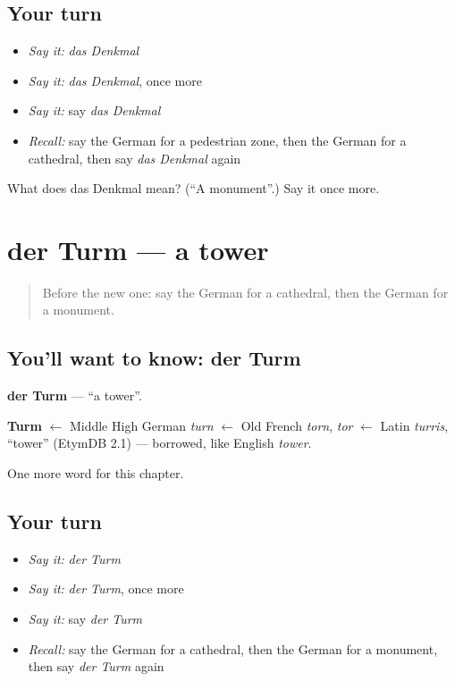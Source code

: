 \subsection*{Your turn}
\begin{itemize}
\raggedright
  \item \emph{Say it:} \emph{das Denkmal}
  \item \emph{Say it:} \emph{das Denkmal}, once more
  \item \emph{Say it:} say \emph{das Denkmal}
  \item \emph{Recall:} say the German for a pedestrian zone, then the German for a cathedral, then say \emph{das Denkmal} again
\end{itemize}

\begin{tcolorbox}[breakable,colback=teal!4,colframe=teal!35!black,title={Before you move on}]
What does das Denkmal mean? (\textquotedblleft{}A monument\textquotedblright{}.) Say it once more.
\end{tcolorbox}
\section[der Turm]{der Turm — a tower}

\label{lesson:GE-C195-turm}



\begin{quote}
Before the new one: say the German for a cathedral, then the German for a monument.
\end{quote}

\subsection*{You'll want to know: der Turm}
\textbf{der Turm} — \textquotedblleft{}a tower\textquotedblright{}.

\begin{cousinweb}
\textbf{Turm} $\leftarrow$ Middle High German \emph{turn} $\leftarrow$ Old French \emph{torn}, \emph{tor} $\leftarrow$ Latin \emph{turris}, \textquotedblleft{}tower\textquotedblright{} (EtymDB 2.1) — borrowed, like English \emph{tower}.
\end{cousinweb}

\begin{grammarlens}[title={What you've built}]
One more word for this chapter.
\end{grammarlens}

\subsection*{Your turn}
\begin{itemize}
\raggedright
  \item \emph{Say it:} \emph{der Turm}
  \item \emph{Say it:} \emph{der Turm}, once more
  \item \emph{Say it:} say \emph{der Turm}
  \item \emph{Recall:} say the German for a cathedral, then the German for a monument, then say \emph{der Turm} again
\end{itemize}

